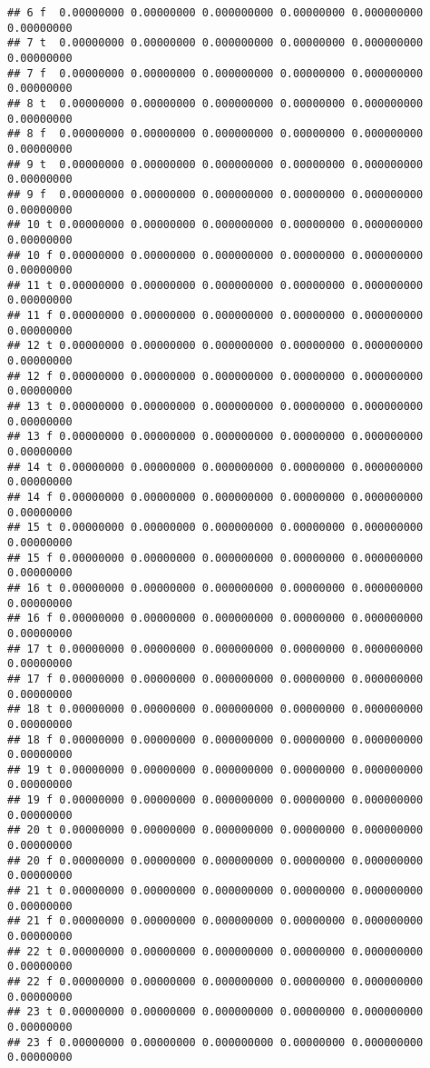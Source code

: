 \documentclass[]{article}
\begin{document}
\begin{verbatim}
## 6 f  0.00000000 0.00000000 0.000000000 0.00000000 0.000000000 0.00000000
## 7 t  0.00000000 0.00000000 0.000000000 0.00000000 0.000000000 0.00000000
## 7 f  0.00000000 0.00000000 0.000000000 0.00000000 0.000000000 0.00000000
## 8 t  0.00000000 0.00000000 0.000000000 0.00000000 0.000000000 0.00000000
## 8 f  0.00000000 0.00000000 0.000000000 0.00000000 0.000000000 0.00000000
## 9 t  0.00000000 0.00000000 0.000000000 0.00000000 0.000000000 0.00000000
## 9 f  0.00000000 0.00000000 0.000000000 0.00000000 0.000000000 0.00000000
## 10 t 0.00000000 0.00000000 0.000000000 0.00000000 0.000000000 0.00000000
## 10 f 0.00000000 0.00000000 0.000000000 0.00000000 0.000000000 0.00000000
## 11 t 0.00000000 0.00000000 0.000000000 0.00000000 0.000000000 0.00000000
## 11 f 0.00000000 0.00000000 0.000000000 0.00000000 0.000000000 0.00000000
## 12 t 0.00000000 0.00000000 0.000000000 0.00000000 0.000000000 0.00000000
## 12 f 0.00000000 0.00000000 0.000000000 0.00000000 0.000000000 0.00000000
## 13 t 0.00000000 0.00000000 0.000000000 0.00000000 0.000000000 0.00000000
## 13 f 0.00000000 0.00000000 0.000000000 0.00000000 0.000000000 0.00000000
## 14 t 0.00000000 0.00000000 0.000000000 0.00000000 0.000000000 0.00000000
## 14 f 0.00000000 0.00000000 0.000000000 0.00000000 0.000000000 0.00000000
## 15 t 0.00000000 0.00000000 0.000000000 0.00000000 0.000000000 0.00000000
## 15 f 0.00000000 0.00000000 0.000000000 0.00000000 0.000000000 0.00000000
## 16 t 0.00000000 0.00000000 0.000000000 0.00000000 0.000000000 0.00000000
## 16 f 0.00000000 0.00000000 0.000000000 0.00000000 0.000000000 0.00000000
## 17 t 0.00000000 0.00000000 0.000000000 0.00000000 0.000000000 0.00000000
## 17 f 0.00000000 0.00000000 0.000000000 0.00000000 0.000000000 0.00000000
## 18 t 0.00000000 0.00000000 0.000000000 0.00000000 0.000000000 0.00000000
## 18 f 0.00000000 0.00000000 0.000000000 0.00000000 0.000000000 0.00000000
## 19 t 0.00000000 0.00000000 0.000000000 0.00000000 0.000000000 0.00000000
## 19 f 0.00000000 0.00000000 0.000000000 0.00000000 0.000000000 0.00000000
## 20 t 0.00000000 0.00000000 0.000000000 0.00000000 0.000000000 0.00000000
## 20 f 0.00000000 0.00000000 0.000000000 0.00000000 0.000000000 0.00000000
## 21 t 0.00000000 0.00000000 0.000000000 0.00000000 0.000000000 0.00000000
## 21 f 0.00000000 0.00000000 0.000000000 0.00000000 0.000000000 0.00000000
## 22 t 0.00000000 0.00000000 0.000000000 0.00000000 0.000000000 0.00000000
## 22 f 0.00000000 0.00000000 0.000000000 0.00000000 0.000000000 0.00000000
## 23 t 0.00000000 0.00000000 0.000000000 0.00000000 0.000000000 0.00000000
## 23 f 0.00000000 0.00000000 0.000000000 0.00000000 0.000000000 0.00000000

\end{verbatim}
\end{document}
